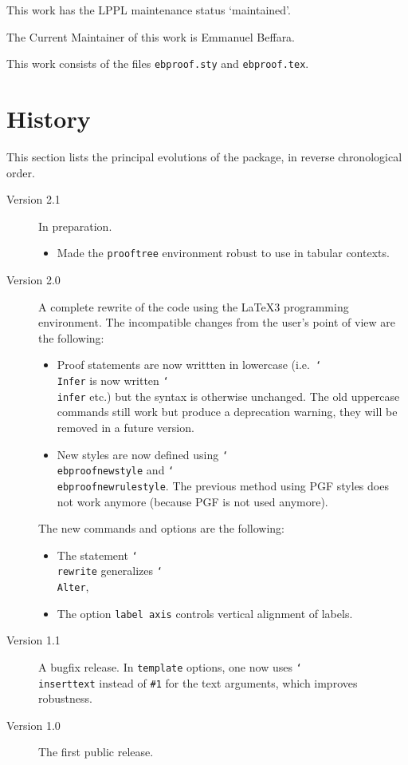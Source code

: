\documentclass{article}
\newcommand\lit[1]{\texttt{#1}}
\newcommand\cs[1]{\lit{\char`\\#1}}
\newcommand\env[1]{\lit{#1}}
\newcommand\opt[1]{\lit{#1}}
\begin{document}
This work has the LPPL maintenance status `maintained'.

The Current Maintainer of this work is Emmanuel Beffara.

This work consists of the files \texttt{ebproof.sty} and \texttt{ebproof.tex}.

\section{History}

This section lists the principal evolutions of the package, in reverse
chronological order.
\begin{description}
\item[Version 2.1]
  In preparation.
  \begin{itemize}
  \item Made the \env{prooftree} environment robust to use in tabular
    contexts.
  \end{itemize}
\item[Version 2.0]
  A complete rewrite of the code using the \LaTeX3 programming environment. 
  The incompatible changes from the user's point of view are the following:
  \begin{itemize}
  \item Proof statements are now writtten in lowercase ({i.e.} \cs{Infer} is
    now written \cs{infer} etc.) but the syntax is otherwise unchanged.
    The old uppercase commands still work but produce a deprecation warning,
    they will be removed in a future version.
  \item New styles are now defined using \cs{ebproofnewstyle} and
    \cs{ebproofnewrulestyle}. The previous method using PGF styles does not
    work anymore (because PGF is not used anymore).
  \end{itemize}
  The new commands and options are the following:
  \begin{itemize}
  \item The statement \cs{rewrite} generalizes \cs{Alter},
  \item The option \opt{label axis} controls vertical alignment of labels.
  \end{itemize}
\item[Version 1.1]
  A bugfix release.
  In \opt{template} options, one now uses \cs{inserttext} instead of \lit{\#1}
  for the text arguments, which improves robustness.
\item[Version 1.0]
  The first public release.
\end{description}
\end{document}
